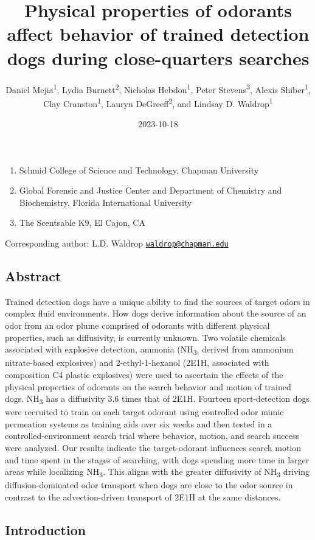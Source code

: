 \documentclass[
]{article}
\title{Physical properties of odorants affect behavior of trained detection dogs during close-quarters searches}
\author{Daniel Mejia\textsuperscript{1}, Lydia Burnett\textsuperscript{2}, Nicholas Hebdon\textsuperscript{1}, Peter Stevens\textsuperscript{3}, Alexis Shiber\textsuperscript{1}, Clay Cranston\textsuperscript{1}, Lauryn DeGreeff\textsuperscript{2}, and Lindsay D. Waldrop\textsuperscript{1}}
\date{2023-10-18}
\providecommand{\tightlist}{%
  \setlength{\itemsep}{0pt}\setlength{\parskip}{0pt}}
\begin{document}
\maketitle

\begin{enumerate}
\def\labelenumi{\arabic{enumi}.}
\tightlist
\item
  Schmid College of Science and Technology, Chapman University
\item
  Global Forensic and Justice Center and Department of Chemistry and Biochemistry, Florida International University
\item
  The Scentsable K9, El Cajon, CA
\end{enumerate}

Corresponding author: L.D. Waldrop \href{mailto:waldrop@chapman.edu}{\nolinkurl{waldrop@chapman.edu}}

\hypertarget{abstract}{%
\subsection{Abstract}\label{abstract}}

Trained detection dogs have a unique ability to find the sources of target odors in complex fluid environments. How dogs derive information about the source of an odor from an odor plume comprised of odorants with different physical properties, such as diffusivity, is currently unknown. Two volatile chemicals associated with explosive detection, ammonia (NH\textsubscript{3}, derived from ammonium nitrate-based explosives) and 2-ethyl-1-hexanol (2E1H, associated with composition C4 plastic explosives) were used to ascertain the effects of the physical properties of odorants on the search behavior and motion of trained dogs. NH\textsubscript{3} has a diffusivity 3.6 times that of 2E1H. Fourteen sport-detection dogs were recruited to train on each target odorant using controlled odor mimic permeation systems as training aids over six weeks and then tested in a controlled-environment search trial where behavior, motion, and search success were analyzed. Our results indicate the target-odorant influences search motion and time spent in the stages of searching, with dogs spending more time in larger areas while localizing NH\textsubscript{3}. This aligns with the greater diffusivity of NH\textsubscript{3} driving diffusion-dominated odor transport when dogs are close to the odor source in contrast to the advection-driven transport of 2E1H at the same distances.

\hypertarget{introduction}{%
\subsection{Introduction}\label{introduction}}
\end{document}
